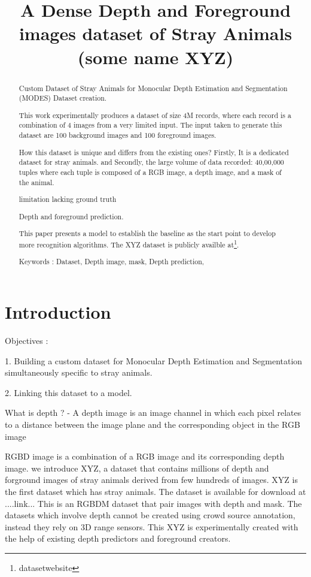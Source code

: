 \documentclass{article}
\title{A Dense Depth and Foreground images dataset of Stray Animals (some name XYZ)}
\begin{document}
\maketitle

\begin{abstract}
Custom Dataset of Stray Animals for Monocular Depth Estimation and Segmentation (MODES) 
Dataset creation. 

This work experimentally produces a dataset of size 4M records, where each record is a combination of 4 images from a very limited input. The input taken to generate this dataset are 100 background images and 100 foreground images.

How this dataset is unique and differs from the existing ones?  Firstly, It is a dedicated dataset for stray animals. and Secondly, the large
volume of data recorded: 40,00,000 tuples where each tuple is composed of a RGB image, a depth image, and a mask of the animal. 

limitation lacking ground truth

Depth and foreground prediction.

This paper presents a model to establish the baseline as the start point to develop more recognition algorithms. The XYZ dataset is publicly availble at\footnote{datasetwebsite}.

Keywords : Dataset, Depth image, mask, Depth prediction,
\end{abstract}

 

\section{Introduction}
Objectives :

1. Building a custom dataset for Monocular Depth Estimation and Segmentation simultaneously specific to stray animals.

2. Linking this dataset to a model.


What is depth ? - A depth image is an image channel in which each pixel relates to a distance between the image plane and the corresponding object in the RGB image

RGBD image is a combination of a RGB image and its corresponding depth image. 
we introduce XYZ, a dataset that contains millions of depth and forground images of stray animals derived from few hundreds of images. XYZ is the first dataset which has stray animals. The dataset is available for download at ....link...
This is an RGBDM dataset that pair images with depth and mask. The datasets which involve depth cannot be created using crowd source annotation, instead they rely on 3D range sensors. This XYZ is experimentally created with the help of existing depth predictors and foreground creators.
\end{document}
